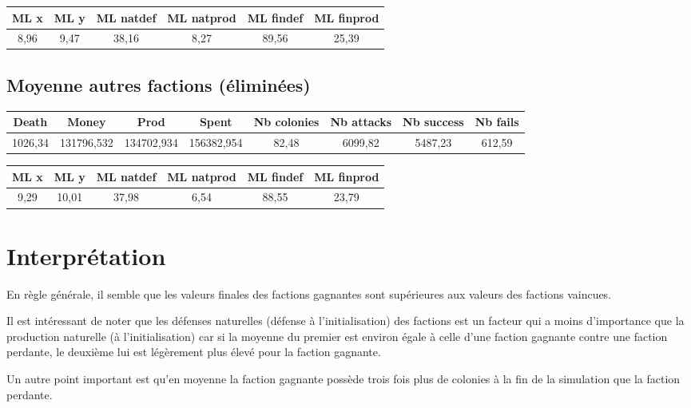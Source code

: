 \begin{tabular}{|c|c|c|c|c|c|}
	\hline ML x & ML y & ML natdef & ML natprod & ML findef & ML finprod \\ 
	\hline 8,96 & 9,47 & 38,16 & 8,27 & 89,56 & 25,39 \\
	\hline
\end{tabular}

\subsection{Moyenne autres factions (éliminées)}

\begin{tabular}{|c|c|c|c|c|c|c|c|}
	\hline Death & Money & Prod & Spent & Nb colonies & Nb attacks & Nb success & Nb fails \\ 
	\hline 1026,34 & 131796,532 & 134702,934 & 156382,954 & 82,48 & 6099,82 & 5487,23 & 612,59 \\
	\hline
\end{tabular}

\begin{tabular}{|c|c|c|c|c|c|}
	\hline ML x & ML y & ML natdef & ML natprod & ML findef & ML finprod \\ 
	\hline 9,29 & 10,01 & 37,98 & 6,54 & 88,55 & 23,79 \\
	\hline
\end{tabular}

\section{Interprétation}

En règle générale, il semble que les valeurs finales des factions gagnantes sont supérieures aux valeurs des factions vaincues.

Il est intéressant de noter que les défenses naturelles (défense à l’initialisation) des factions est un facteur qui a moins d’importance que la production naturelle (à l’initialisation) car si la moyenne du premier est environ égale à celle d’une faction gagnante contre une faction perdante, le deuxième lui est légèrement plus élevé pour la faction gagnante.

Un autre point important est qu’en moyenne la faction gagnante possède trois fois plus de colonies à la fin de la simulation que la faction perdante.